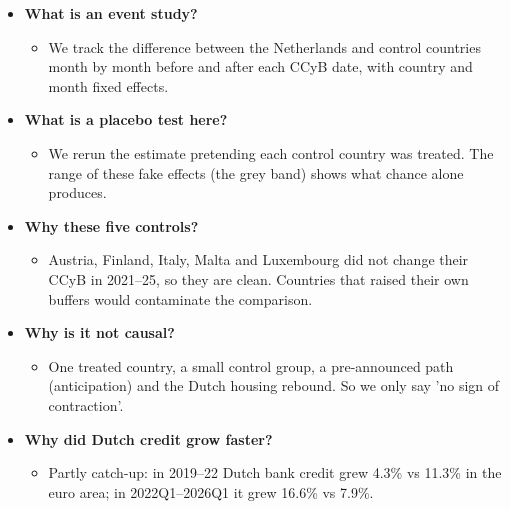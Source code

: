 \documentclass[10pt]{article}
\begin{document}
\begin{tcolorbox}[sbox,width=0.495\linewidth,height=14.6cm,nobeforeafter,box align=top,fit basedim=11pt,colframe=nlred!70,colbacktitle=nlred!8,coltitle=nlred,title=LIKELY CHALLENGES · definitions and logic]
\begin{itemize}
\item[\textcolor{navy}{\textbf{Q}}] \textbf{What is an event study?}
\begin{itemize}
\item We track the difference between the Netherlands and control countries month by month before and after each CCyB date, with country and month fixed effects.
\end{itemize}
\item[\textcolor{navy}{\textbf{Q}}] \textbf{What is a placebo test here?}
\begin{itemize}
\item We rerun the estimate pretending each control country was treated. The range of these fake effects (the grey band) shows what chance alone produces.
\end{itemize}
\item[\textcolor{navy}{\textbf{Q}}] \textbf{Why these five controls?}
\begin{itemize}
\item Austria, Finland, Italy, Malta and Luxembourg did not change their CCyB in 2021–25, so they are clean. Countries that raised their own buffers would contaminate the comparison.
\end{itemize}
\item[\textcolor{navy}{\textbf{Q}}] \textbf{Why is it not causal?}
\begin{itemize}
\item One treated country, a small control group, a pre-announced path (anticipation) and the Dutch housing rebound. So we only say 'no sign of contraction'.
\end{itemize}
\item[\textcolor{navy}{\textbf{Q}}] \textbf{Why did Dutch credit grow faster?}
\begin{itemize}
\item Partly catch-up: in 2019–22 Dutch bank credit grew 4.3\% vs 11.3\% in the euro area; in 2022Q1–2026Q1 it grew 16.6\% vs 7.9\%.
\end{itemize}
\end{itemize}
\end{tcolorbox}
\newpage
\end{document}
